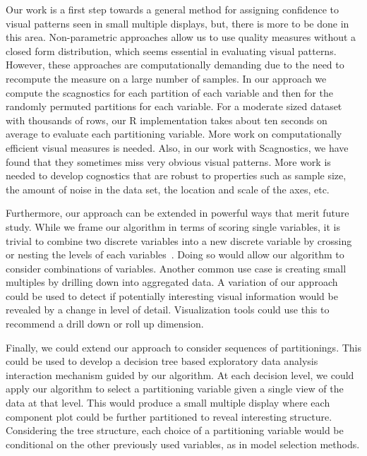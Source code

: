 Our work is a first step towards a general method for assigning confidence to visual patterns seen in small multiple displays, but, there is more to be done in this area. Non-parametric approaches allow us to use quality measures without a closed form distribution, which seems essential in evaluating visual patterns. However, these approaches are computationally demanding due to the need to recompute the measure on a large number of samples. In our approach we compute the scagnostics for each partition of each variable and then for the randomly permuted partitions for each variable. For a moderate sized dataset with thousands of rows, our R implementation takes about ten seconds on average to evaluate each partitioning variable. More work on computationally efficient visual measures is needed. Also, in our work with Scagnostics, we have found that they sometimes miss very obvious visual patterns. More work is needed to develop cognostics that are robust to properties such as sample size, the amount of noise in the data set, the location and scale of the axes, etc. 

Furthermore, our approach can be extended in powerful ways that merit future study. While we frame our algorithm in terms of scoring single variables, it is trivial to combine two discrete variables into a new discrete variable by crossing or nesting the levels of each variables~\cite{Wilkinson2005GG,Stolte2002}. Doing so would allow our algorithm to consider combinations of variables. 
Another common use case is creating small multiples by drilling down into aggregated data. A variation of our approach could be used to detect if potentially interesting visual information would be revealed by a change in level of detail. Visualization tools could use this to recommend a drill down or roll up dimension.

Finally, we could extend our approach to consider sequences of partitionings. This could be used to develop a decision tree based exploratory data analysis interaction mechanism guided by our algorithm. At each decision level, we could apply our algorithm to select a partitioning variable given a single view of the data at that level. This would produce a small multiple display where each component plot could be further partitioned to reveal interesting structure. Considering the tree structure, each choice of a partitioning variable would be conditional on the other previously used variables, as in model selection methods. 

